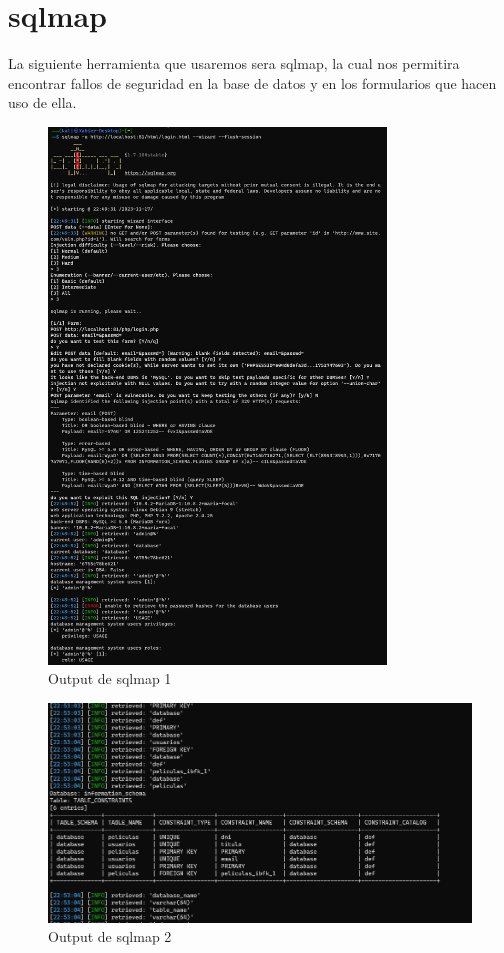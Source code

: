 \documentclass{report}
\begin{document}
        \section{sqlmap}
            La siguiente herramienta que usaremos sera sqlmap, la cual nos permitira encontrar fallos de seguridad en la base de datos y en los formularios que hacen uso de ella.
            \begin{figure}[H]
                \centering
                \includegraphics[width=0.80\textwidth]{./img/audit1/sqlmap1.png}
                \caption{Output de sqlmap 1}
            \end{figure}
            \begin{figure}[H]
                \centering
                \includegraphics[width=\textwidth]{./img/audit1/sqlmap2.png}
                \caption{Output de sqlmap 2}
            \end{figure}
\end{document}
